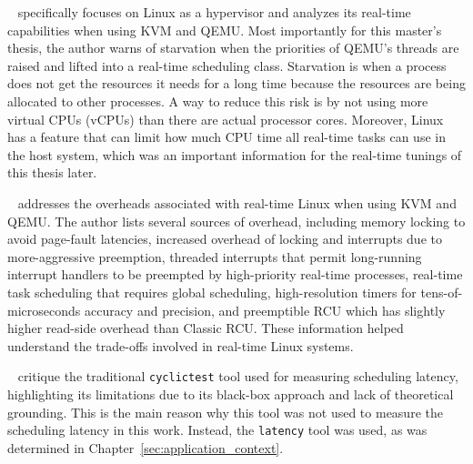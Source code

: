 \documentclass[MMR,Master,english]{twbook}
\begin{document}
\bigskip \noindent \citeauthor{kiszkaLinuxRealTimeHypervisor2009}~\cite{kiszkaLinuxRealTimeHypervisor2009} specifically focuses on Linux as a hypervisor and analyzes its real-time capabilities when using KVM and QEMU. Most importantly for this master's thesis, the author warns of starvation when the priorities of QEMU’s threads are raised and lifted into a real-time scheduling class. Starvation is when a process does not get the resources it needs for a long time because the resources are being allocated to other processes. A way to reduce this risk is by not using more virtual CPUs (vCPUs) than there are actual processor cores. Moreover, Linux has a feature that can limit how much CPU time all real-time tasks can use in the host system, which was an important information for the real-time tunings of this thesis later.

\clearpage

\bigskip \noindent \citeauthor{mckenneyRealTimeVs2008}~\cite{mckenneyRealTimeVs2008} addresses the overheads associated with real-time Linux when using KVM and QEMU. The author lists several sources of overhead, including memory locking to avoid page-fault latencies, increased overhead of locking and interrupts due to more-aggressive preemption, threaded interrupts that permit long-running interrupt handlers to be preempted by high-priority real-time processes, real-time task scheduling that requires global scheduling, high-resolution timers for tens-of-microseconds accuracy and precision, and preemptible RCU which has slightly higher read-side overhead than Classic RCU. These information helped understand the trade-offs involved in real-time Linux systems.

\bigskip \noindent \citeauthor{deoliveiraDemystifyingRealTimeLinux2020}~\cite{deoliveiraDemystifyingRealTimeLinux2020} critique the traditional \texttt{cyclictest} tool used for measuring scheduling latency, highlighting its limitations due to its black-box approach and lack of theoretical grounding. This is the main reason why this tool was not used to measure the scheduling latency in this work. Instead, the \texttt{latency} tool was used, as was determined in Chapter~\ref{sec:application_context}.
\end{document}
